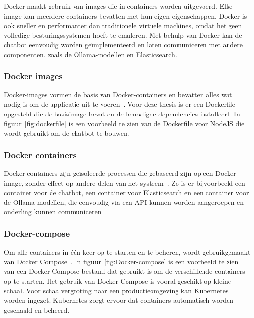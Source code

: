 Docker maakt gebruik van images die in containers worden uitgevoerd. Elke image kan meerdere containers bevatten met hun eigen eigenschappen.
Docker is ook sneller en performanter dan traditionele virtuele machines, omdat het geen volledige besturingssystemen hoeft te emuleren.
Met behulp van Docker kan de chatbot eenvoudig worden geïmplementeerd en laten communiceren met andere componenten, zoals de Ollama-modellen en Elasticsearch.

\subsubsection{Docker images}
Docker-images vormen de basis van Docker-containers en bevatten alles wat nodig is om de applicatie uit te voeren~\autocite{Schmitt2024}.
Voor deze thesis is er een Dockerfile opgesteld die de basisimage bevat en de benodigde dependencies installeert.
In figuur~\ref{fig:dockerfile} is een voorbeeld te zien van de Dockerfile voor NodeJS die wordt gebruikt om de chatbot te bouwen.

\subsubsection{Docker containers}
Docker-containers zijn geïsoleerde processen die gebaseerd zijn op een Docker-image, zonder effect op andere delen van het systeem~\textcite{Schmitt2024}.
Zo is er bijvoorbeeld een container voor de chatbot, een container voor Elasticsearch en een container voor de Ollama-modellen, die eenvoudig via een API kunnen worden aangeroepen en onderling kunnen communiceren.

\subsubsection{Docker-compose}
Om alle containers in één keer op te starten en te beheren, wordt gebruikgemaakt van Docker Compose~\autocite{docker2025}.
In figuur~\ref{fig:Docker-compose} is een voorbeeld te zien van een Docker Compose-bestand dat gebruikt is om de verschillende containers op te starten.
Het gebruik van Docker Compose is vooral geschikt op kleine schaal. Voor schaalvergroting naar een productieomgeving kan Kubernetes worden ingezet.
Kubernetes zorgt ervoor dat containers automatisch worden geschaald en beheerd.
